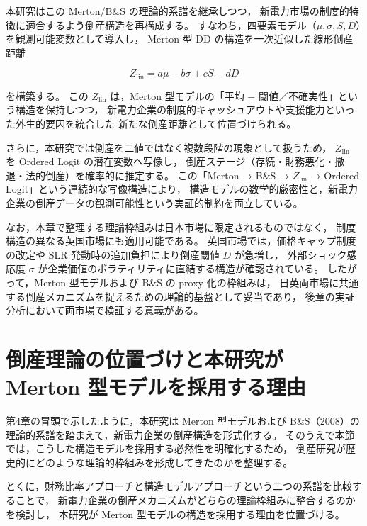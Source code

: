 本研究はこの Merton/B\&S の理論的系譜を継承しつつ，
新電力市場の制度的特徴に適合するよう倒産構造を再構成する。
すなわち，四要素モデル（$\mu, \sigma, S, D$）を観測可能変数として導入し，
Merton 型 DD の構造を一次近似した線形倒産距離



\[
Z_{\text{lin}} = a\mu - b\sigma + cS - dD
\]



を構築する。
この $Z_{\text{lin}}$ は，Merton 型モデルの「平均 − 閾値／不確実性」という構造を保持しつつ，
新電力企業の制度的キャッシュアウトや支援能力といった外生的要因を統合した
新たな倒産距離として位置づけられる。

さらに，本研究では倒産を二値ではなく複数段階の現象として扱うため，
$Z_{\text{lin}}$ を Ordered Logit の潜在変数へ写像し，
倒産ステージ（存続・財務悪化・撤退・法的倒産）を確率的に推定する。
この「Merton → B\&S → $Z_{\text{lin}}$ → Ordered Logit」という連続的な写像構造により，
構造モデルの数学的厳密性と，新電力企業の倒産データの観測可能性という実証的制約を両立している。

なお，本章で整理する理論枠組みは日本市場に限定されるものではなく，
制度構造の異なる英国市場にも適用可能である。
英国市場では，価格キャップ制度の改定や SLR 発動時の追加負担により倒産閾値 $D$ が急増し，
外部ショック感応度 $\sigma$ が企業価値のボラティリティに直結する構造が確認されている。
したがって，Merton 型モデルおよび B\&S の proxy 化の枠組みは，
日英両市場に共通する倒産メカニズムを捉えるための理論的基盤として妥当であり，
後章の実証分析において両市場で検証する意義がある。


\section{倒産理論の位置づけと本研究が Merton 型モデルを採用する理由}

第4章の冒頭で示したように，本研究は Merton 型モデルおよび B\&S（2008）の
理論的系譜を踏まえて，新電力企業の倒産構造を形式化する。
そのうえで本節では，こうした構造モデルを採用する必然性を明確化するため，
倒産研究が歴史的にどのような理論的枠組みを形成してきたのかを整理する。

とくに，財務比率アプローチと構造モデルアプローチという二つの系譜を比較することで，
新電力企業の倒産メカニズムがどちらの理論枠組みに整合するのかを検討し，
本研究が Merton 型モデルの構造を採用する理由を位置づける。


